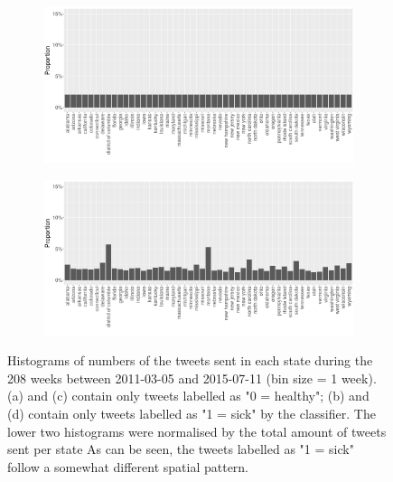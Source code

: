 \documentclass[11pt, a4paper]{report}\usepackage[]{graphicx}\usepackage[]{color}
\begin{document}
\begin{figure}[h]
    \begin{subfigure}[t]{0.49\textwidth}
  \includegraphics[width=1\linewidth]{activity_rel_healthy_statename_Twitter_full_aggregated.png}
  \caption{}
  \end{subfigure}
  \hfill
    \begin{subfigure}[t]{0.49\textwidth}
  \includegraphics[width=1\linewidth]{activity_rel_sick_statename_Twitter_full_aggregated.png}
  \caption{}
  \end{subfigure}
  \caption{Histograms of numbers of the tweets sent in each state during the 208 weeks between 2011-03-05 and 2015-07-11 (bin size = 1 week). (a) and (c) contain only tweets labelled as "0 = healthy"; (b) and (d) contain only tweets labelled as "1 = sick" by the classifier. The lower two histograms were normalised by the total amount of tweets sent per state As can be seen, the tweets labelled as "1 = sick" follow a somewhat different spatial pattern.}
  \label{fig:tweets_state_healthy_sick}
\end{figure}
\end{document}
